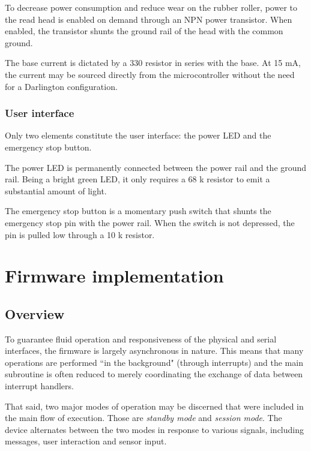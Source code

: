\documentclass{article}
\begin{document}
	To decrease power consumption and reduce wear on the rubber roller, power
	to the read head is enabled on demand through an NPN power transistor.
	When enabled, the transistor shunts the ground rail of the head with the
	common ground.
	
	The base current is dictated by a 330 \textOmega {} resistor in series with
	the base. At 15 mA, the current may be sourced directly from the
	microcontroller without the need for a Darlington configuration.
	
	\subsubsection{User interface}
	
	Only two elements constitute the user interface: the power LED and the
	emergency stop button.
	
	The power LED is permanently connected between the power rail and the
	ground rail. Being a bright green LED, it only requires a 68 k\textOmega {}
	resistor to emit a substantial amount of light.
	
	The emergency stop button is a momentary push switch that shunts the
	emergency stop pin with the power rail. When the switch is not depressed,
	the pin is pulled low through a 10 k\textOmega {} resistor.
	
	\newpage
	\section{Firmware implementation}
	
	\subsection{Overview}
	\label{sec:firmoverview}
	
	To guarantee fluid operation and responsiveness of the physical and serial
	interfaces, the firmware is largely asynchronous in nature. This means that
	many operations are performed ``in the background" (through interrupts) and
	the main subroutine is often reduced to merely coordinating the exchange of
	data between interrupt handlers.
	
	That said, two major modes of operation may be discerned that were included
	in the main flow of execution. Those are \textit{standby mode} and
	\textit{session mode}. The device alternates between the two modes in
	response to various signals, including messages, user interaction and
	sensor input.
	
\end{document}
